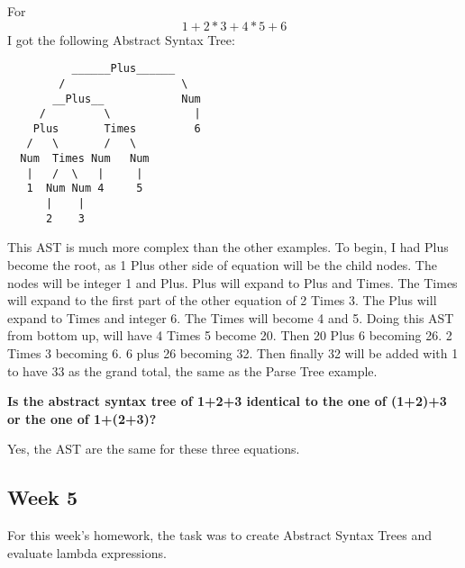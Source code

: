 \documentclass{article}
\theoremstyle{theorem}
\theoremstyle{definition}
\theoremstyle{remark}
\begin{document}
\noindent\newline\newline For $$1+2*3+4*5+6$$ I got the following Abstract Syntax Tree:

\begin{verbatim}
          ______Plus______
        /                  \
       __Plus__            Num
     /         \             |
    Plus       Times         6
   /   \       /   \
  Num  Times Num   Num
   |   /  \   |     |
   1  Num Num 4     5
      |    |
      2    3
\end{verbatim}
\noindent\newline This AST is much more complex than the other examples. To begin, I had Plus become the root, as 1 Plus other side of equation will be the child nodes. The nodes will be integer 1 and Plus. Plus will expand to Plus and Times. The Times will expand to the first part of the other equation of 2 Times 3. The Plus will expand to Times and integer 6. The Times will become 4 and 5. Doing this AST from bottom up, will have 4 Times 5 become 20. Then 20 Plus 6 becoming 26. 2 Times 3 becoming 6. 6 plus 26 becoming 32. Then finally 32 will be added with 1 to have 33 as the grand total, the same as the Parse Tree example.

\noindent\newline\newline
\textbf{Is the abstract syntax tree of 1+2+3 identical to the one of (1+2)+3 or the one of 1+(2+3)?}

\noindent Yes, the AST are the same for these three equations.

\subsection{Week 5} For this week's homework, the task was to create Abstract Syntax Trees and evaluate lambda expressions.
\end{document}
